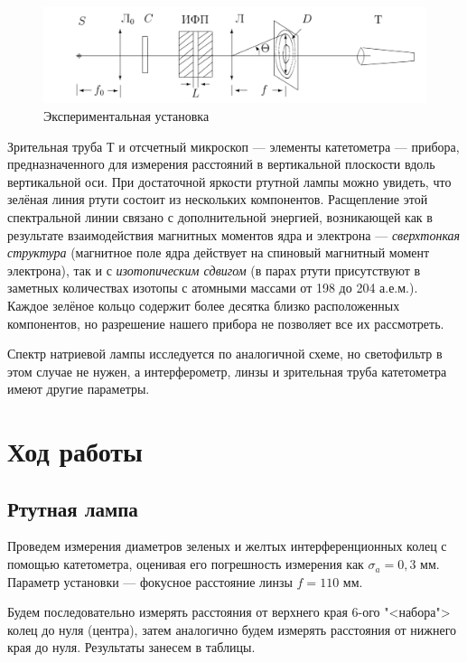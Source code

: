 \documentclass[a4paper,12pt]{article} %
\begin{document}
		\begin{figure}[h!]
		\centering
		\includegraphics[width=\linewidth]{lab.png}
		\caption{Экспериментальная установка}
		\label{lab}
	\end{figure}

	
\noindent Зрительная труба $ Т $ и отсчетный микроскоп  --- элементы катетометра --- прибора, предназначенного для измерения расстояний в вертикальной плоскости вдоль вертикальной оси. 
	При достаточной яркости ртутной лампы можно увидеть, что зелёная линия
	ртути состоит из нескольких компонентов. Расщепление этой спектральной линии связано с дополнительной энергией, возникающей как в результате взаимодействия магнитных моментов ядра и электрона --- \textit{сверхтонкая структура} (магнитное поле ядра действует на спиновый магнитный момент электрона), так и с \textit{изотопическим сдвигом} (в парах ртути присутствуют в заметных количествах изотопы с атомными массами от 198 до 204 а.е.м.). Каждое зелёное кольцо содержит более десятка близко расположенных компонентов, но разрешение нашего прибора не позволяет все их рассмотреть.
	
\medskip	
	
\noindent Спектр натриевой лампы исследуется по аналогичной схеме, но светофильтр в этом случае не нужен, а интерферометр, линзы и зрительная труба катетометра
	имеют другие параметры.

\section{Ход работы}

\subsection{Ртутная лампа}
		
\noindent Проведем измерения диаметров зеленых и желтых интерференционных колец с помощью катетометра, оценивая его погрешность измерения как $ \sigma_a = 0,3 $ мм. Параметр установки --- фокусное расстояние линзы $ f = 110 $ мм.
		
\medskip		
		
\noindent Будем последовательно измерять расстояния от верхнего края 6-ого "<набора"> колец до нуля (центра), затем аналогично будем измерять расстояния от нижнего края до нуля. Результаты занесем в таблицы. 
		
\end{document}
